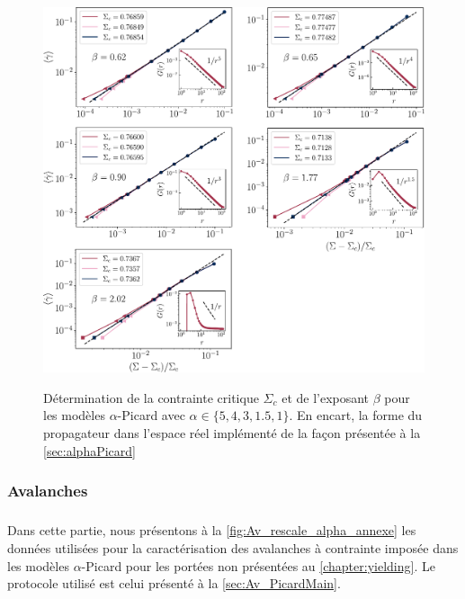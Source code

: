 \begin{figure}[H]
	\centering
	\includegraphics[width=\textwidth]{Chapitre6/Figures/CP_alphaPicard.pdf}
	\label{fig:CP_aPicard}
	\caption{Détermination de la contrainte critique $\Sigma_c$ et de l'exposant $\beta$ pour les modèles $\alpha$-Picard avec $\alpha \in \{ 5, 4, 3, 1.5, 1 \}$. En encart, la forme du propagateur dans l'espace réel implémenté de la façon présentée à la \autoref{sec:alphaPicard}}
\end{figure}

\subsubsection{Avalanches}

\subparagraph{}Dans cette partie, nous présentons à la \autoref{fig:Av_rescale_alpha_annexe} les données utilisées pour la caractérisation des avalanches à contrainte imposée dans les modèles $\alpha$-Picard pour les portées non présentées au \autoref{chapter:yielding}. Le protocole utilisé est celui présenté à la \autoref{sec:Av_PicardMain}.

